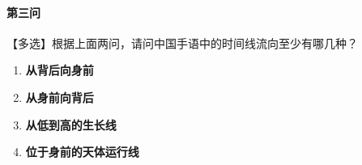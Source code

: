 \documentclass[12pt, a4paper, oneside]{ctexart}
\begin{document}
\paragraph{第三问}
【多选】根据上面两问，请问中国手语中的时间线流向至少有哪几种？
\begin{enumerate}[label=\Alph*.]
    \item \textbf{从背后向身前}
    \item \textbf{从身前向背后}
    \item \textbf{从低到高的生长线}
    \item \textbf{位于身前的天体运行线}
\end{enumerate}



\newpage
\end{document}
